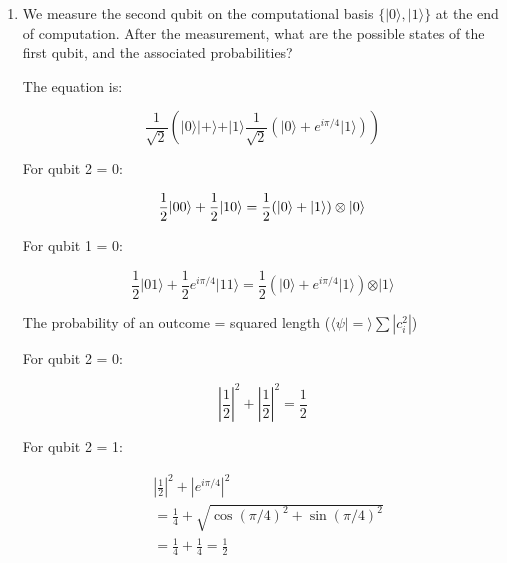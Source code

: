 \documentclass[10pt]{article}
\newcommand{\ket}[1]{\vert #1 \rangle}
\newcommand{\braket}[2]{\langle #1 \vert #2 \rangle}
\begin{document}
\begin{enumerate}
\begin{enumerate}
          Apply phase change $e^{i\pi/4}$:

          \begin{align*}
            \frac{1}{2}(\ket{00} + \ket{10} + \ket{01} + e^{i\pi/4}\ket{11})
          \end{align*}

        \item{We measure the second qubit on the computational basis $\{\ket{0}, \ket{1}\}$ at the end of computation. After the measurement, what are the possible states of the first qubit, and the associated probabilities?}

          The equation is:

          \begin{equation*}
            \frac{1}{\sqrt2}(\ket{0}\ket{+} + \ket{1} \frac{1}{\sqrt2}(\ket{0} + e^{i\pi/4}\ket{1}))
          \end{equation*}

          For qubit 2 = 0:

          \begin{equation*}
            \frac12 \ket{00} + \frac12 \ket{10} = \frac12 (\ket{0} + \ket{1}) \otimes \ket{0} \\
          \end{equation*}

          For qubit 1 = 0:

          \begin{equation*}
            \frac12 \ket{01} + \frac12 e^{i\pi/4} \ket{11} = \frac12 (\ket{0} + e^{i\pi/4} \ket{1}) \otimes \ket{1}
          \end{equation*}

          The probability of an outcome = squared length ($\braket{\psi} = \sum |c_i^2|$)

          For qubit 2 = 0:

          \begin{equation*}
            |\frac12|^2 + |\frac12|^2 = \frac12
          \end{equation*}

          For qubit 2 = 1:

          \begin{align*}
            &|\frac12|^2 + |e^{i\pi/4}|^2 \\
            &=\frac14 + \sqrt{\cos(\pi/4)^2 + \sin(\pi/4)^2} \\
            &= \frac14 + \frac14 = \frac12
          \end{align*}


\end{enumerate}
\end{enumerate}
\end{document}
